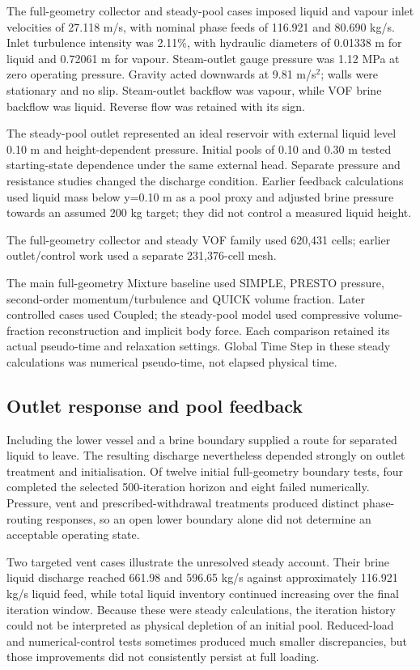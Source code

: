 The full-geometry collector and steady-pool cases imposed liquid and vapour inlet velocities of 27.118 m/s, with nominal phase feeds of 116.921 and 80.690 kg/s. Inlet turbulence intensity was 2.11\%, with hydraulic diameters of 0.01338 m for liquid and 0.72061 m for vapour. Steam-outlet gauge pressure was 1.12 MPa at zero operating pressure. Gravity acted downwards at 9.81 m/s\(^{2}\); walls were stationary and no slip. Steam-outlet backflow was vapour, while VOF brine backflow was liquid. Reverse flow was retained with its sign.

The steady-pool outlet represented an ideal reservoir with external liquid level 0.10 m and height-dependent pressure. Initial pools of 0.10 and 0.30 m tested starting-state dependence under the same external head. Separate pressure and resistance studies changed the discharge condition. Earlier feedback calculations used liquid mass below y=0.10 m as a pool proxy and adjusted brine pressure towards an assumed 200 kg target; they did not control a measured liquid height.

The full-geometry collector and steady VOF family used 620,431 cells; earlier outlet/control work used a separate 231,376-cell mesh.

The main full-geometry Mixture baseline used SIMPLE, PRESTO pressure, second-order momentum/turbulence and QUICK volume fraction. Later controlled cases used Coupled; the steady-pool model used compressive volume-fraction reconstruction and implicit body force. Each comparison retained its actual pseudo-time and relaxation settings. Global Time Step in these steady calculations was numerical pseudo-time, not elapsed physical time.

\subsection{Outlet response and pool feedback}

Including the lower vessel and a brine boundary supplied a route for separated liquid to leave. The resulting discharge nevertheless depended strongly on outlet treatment and initialisation. Of twelve initial full-geometry boundary tests, four completed the selected 500-iteration horizon and eight failed numerically. Pressure, vent and prescribed-withdrawal treatments produced distinct phase-routing responses, so an open lower boundary alone did not determine an acceptable operating state.

Two targeted vent cases illustrate the unresolved steady account. Their brine liquid discharge reached 661.98 and 596.65 kg/s against approximately 116.921 kg/s liquid feed, while total liquid inventory continued increasing over the final iteration window. Because these were steady calculations, the iteration history could not be interpreted as physical depletion of an initial pool. Reduced-load and numerical-control tests sometimes produced much smaller discrepancies, but those improvements did not consistently persist at full loading.

